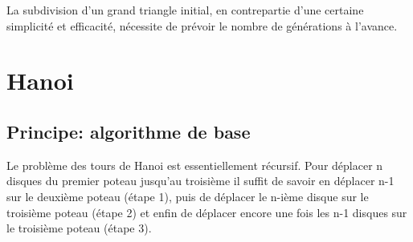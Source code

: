 \documentclass[a4paper, 11pt]{article}%
\begin{document}
                La subdivision d'un grand triangle initial, en
                contrepartie d'une certaine simplicité et efficacité,
                nécessite de prévoir le nombre de générations à l'avance.

\section{Hanoi}

	\subsection{Principe: algorithme de base}
		Le problème des tours de Hanoi est essentiellement récursif. Pour
		déplacer n disques du premier poteau jusqu'au troisième
		il suffit de savoir en déplacer n-1 sur le deuxième poteau (étape 1), puis
		de déplacer le n-ième disque sur le troisième poteau (étape 2) et enfin de
		déplacer encore une fois les n-1 disques sur le troisième poteau (étape 3).
\end{document}
